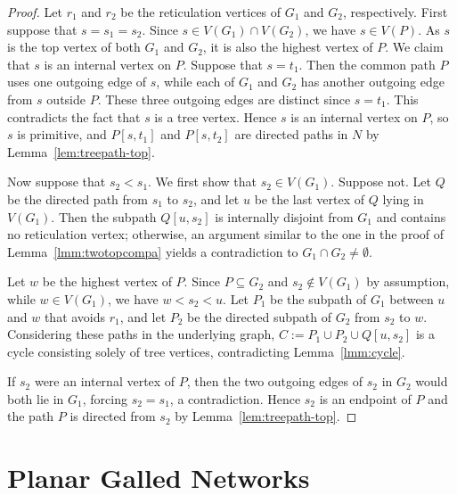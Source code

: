 \documentclass[pdflatex,sn-mathphys-num]{sn-jnl}
\theoremstyle{thmstyleone}%
\theoremstyle{thmstyletwo}%
\theoremstyle{thmstylethree}%
\begin{document}
\begin{proof}
Let $r_1$ and $r_2$ be the reticulation vertices of $G_1$ and $G_2$, respectively. First suppose that $s=s_1=s_2$. Since $s\in V(G_1)\cap V(G_2)$, we have $s\in V(P)$. As $s$ is the top vertex of both $G_1$ and $G_2$, it is also the highest vertex of $P$. We claim that $s$ is an internal vertex on $P$. Suppose that $s=t_1$. Then the common path $P$ uses one outgoing edge of $s$, while each of $G_1$ and $G_2$ has another outgoing edge from $s$ outside $P$. These three outgoing edges are distinct since $s=t_1$. This contradicts the fact that $s$ is a tree vertex. Hence $s$ is an internal vertex on $P$, so $s$ is primitive, and $P[s,t_1]$ and $P[s,t_2]$ are directed paths in $N$ by Lemma~\ref{lem:treepath-top}.

Now suppose that $s_2<s_1$. We first show that $s_2\in V(G_1)$. Suppose not. Let $Q$ be the directed path from $s_1$ to $s_2$, and let $u$ be the last vertex of $Q$ lying in $V(G_1)$. Then the subpath $Q[u,s_2]$ is internally disjoint from $G_1$ and contains no reticulation vertex; otherwise, an argument similar to the one in the proof of Lemma~\ref{lmm:twotopcompa} yields a contradiction to $G_1 \cap G_2 \neq \emptyset$.

Let $w$ be the highest vertex of $P$. Since $P\subseteq G_2$ and $s_2\notin V(G_1)$ by assumption, while $w\in V(G_1)$, we have $w<s_2<u$. Let $P_1$ be the subpath of $G_1$ between $u$ and $w$ that avoids $r_1$, and let $P_2$ be the directed subpath of $G_2$ from $s_2$ to $w$. Considering these paths in the underlying graph, $C:=P_1\cup P_2\cup Q[u,s_2]$ is a cycle consisting solely of tree vertices, contradicting Lemma~\ref{lmm:cycle}.

If $s_2$ were an internal vertex of $P$, then the two outgoing edges of $s_2$ in $G_2$ would both lie in $G_1$, forcing $s_2=s_1$, a contradiction. Hence $s_2$ is an endpoint of $P$ and the path $P$ is directed from $s_2$ by Lemma~\ref{lem:treepath-top}.
\end{proof}




















\section{Planar Galled Networks} \label{sec:upward}
\end{document}
